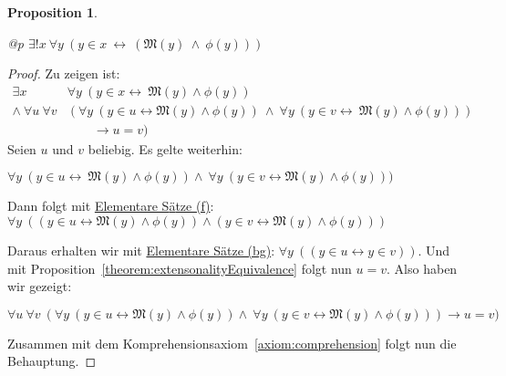 \documentclass[a4paper,german,10pt,twoside]{book}
\newtheorem{prop}[thm]{Proposition}
\theoremstyle{definition}
\theoremstyle{remark}
\begin{document}
\begin{prop}
\label{theorem:comprehension} \hypertarget{theorem:comprehension}{}
\mbox{}
\begin{longtable}{{@{\extracolsep{\fill}}p{\linewidth}}}
\centering $\exists! x\ \forall y\ (y \in x\ \leftrightarrow \ (\mathfrak{M}(y)\ \land \ \phi(y)))$
\end{longtable}

\end{prop}
\begin{proof}
Zu zeigen ist:
$$
\begin{array}{rl}
\exists x                      & \forall y \ (y \in x \leftrightarrow  \ \mathfrak{M}(y) \land \phi(y)) \\
\land \ \forall u \ \forall v  & (\forall y \ (y \in u \leftrightarrow \mathfrak{M}(y) \land \phi(y)) \ \land  \ \forall y \ ( y \in v \leftrightarrow \ \mathfrak{M}(y) \land \phi(y))) \\
       & \qquad \rightarrow u = v)
\end{array}
$$
Seien $u$ und $v$ beliebig. Es gelte weiterhin:

\par
$\forall y \ (y \in u \leftrightarrow \ \mathfrak{M}(y) \land \phi(y)) \land \ \forall y \ ( y \in v \leftrightarrow \mathfrak{M}(y)
\land \phi(y)))$

\par
Dann folgt mit \hyperref{http://qedeq.org/0_03_10/doc/math/qedeq_logic_v1_de.pdf}{}{theorem:predicateCalculus:f}{Elementare S{\"a}tze (f)}: $\forall y \ ((y \in u \leftrightarrow \mathfrak{M}(y) \land \phi(y)) \land (y \in v \leftrightarrow \mathfrak{M}(y) \land \phi(y)))$

\par
Daraus erhalten wir mit \hyperref{http://qedeq.org/0_03_10/doc/math/qedeq_logic_v1_de.pdf}{}{theorem:predicateCalculus:bg}{Elementare S{\"a}tze (bg)}: $\forall y \ ((y \in u \leftrightarrow y \in v ))$. Und mit Proposition~\ref{theorem:extensonalityEquivalence} folgt nun $u = v$. Also haben wir gezeigt:

\par
$\forall u \ \forall v \ (\forall y \ (y \in u \leftrightarrow \mathfrak{M}(y) \land \phi(y)) \land \ \forall y \ (y \in v \leftrightarrow \mathfrak{M}(y) \land \phi(y))) \rightarrow u = v)$

\par
Zusammen mit dem Komprehensionsaxiom~\ref{axiom:comprehension} folgt nun die Behauptung.
\end{proof}
\end{document}
